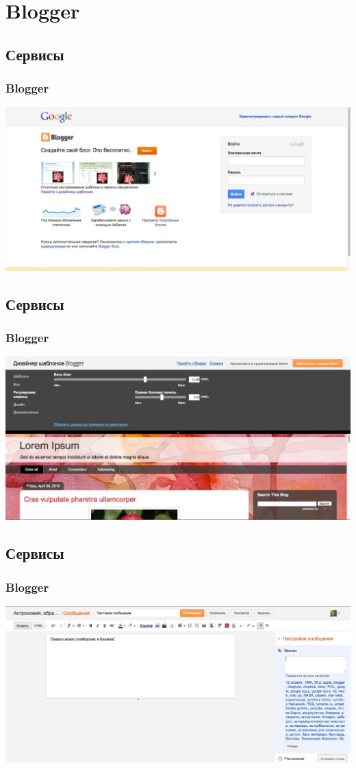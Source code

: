\documentclass[compress,red]{beamer}
\begin{document}
\section{Blogger}
\subsection{Сервисы}
\begin{frame}
  \frametitle{Blogger}
	\centerline{\includegraphics[width=1.0\textwidth]{images/blogger1.jpg}}
\end{frame}

\subsection{Сервисы}
\begin{frame}
  \frametitle{Blogger}
	\centerline{\includegraphics[width=1.0\textwidth]{images/blogger2.jpg}}
\end{frame}

\subsection{Сервисы}
\begin{frame}
  \frametitle{Blogger}
	\centerline{\includegraphics[width=1.0\textwidth]{images/blogger3.jpg}}
\end{frame}
\end{document}
